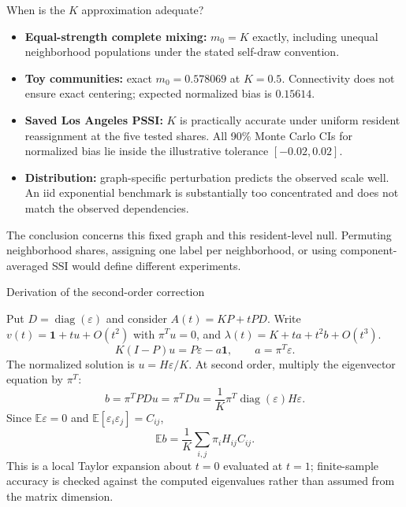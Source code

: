 \begin{frame}{When is the $K$ approximation adequate?}
\small

\begin{itemize}
\item \textbf{Equal-strength complete mixing:} $m_0=K$ exactly, including unequal neighborhood populations under the stated self-draw convention.
\item \textbf{Toy communities:} exact $m_0=0.578069$ at $K=0.5$. Connectivity does not ensure exact centering; expected normalized bias is $0.15614$.
\item \textbf{Saved Los Angeles PSSI:} $K$ is practically accurate under uniform resident reassignment at the five tested shares. All 90\% Monte Carlo CIs for normalized bias lie inside the illustrative tolerance $[-0.02,0.02]$.
\item \textbf{Distribution:} graph-specific perturbation predicts the observed scale well. An iid exponential benchmark is substantially too concentrated and does not match the observed dependencies.
\end{itemize}
\medskip
The conclusion concerns this fixed graph and this resident-level null. Permuting neighborhood shares, assigning one label per neighborhood, or using component-averaged SSI would define different experiments.

\end{frame}

\begin{frame}{Derivation of the second-order correction}
\small

Put $D=\operatorname{diag}(\varepsilon)$ and consider $A(t)=KP+tPD$.
Write $v(t)=\mathbf1+t u+O(t^2)$ with $\pi^Tu=0$, and
$\lambda(t)=K+t a+t^2 b+O(t^3)$.
\[
 K(I-P)u=P\varepsilon-a\mathbf1,\qquad a=\pi^T\varepsilon.
\]
The normalized solution is $u=H\varepsilon/K$. At second order, multiply the eigenvector equation by $\pi^T$:
\[
 b=\pi^TPD u=\pi^TDu
   =\frac1K\pi^T\operatorname{diag}(\varepsilon)H\varepsilon.
\]
Since $\mathbb E\varepsilon=0$ and $\mathbb E[\varepsilon_i\varepsilon_j]=C_{ij}$,
\[
 \mathbb E b=\frac1K\sum_{i,j}\pi_iH_{ij}C_{ij}.
\]
\footnotesize This is a local Taylor expansion about $t=0$ evaluated at $t=1$; finite-sample accuracy is checked against the computed eigenvalues rather than assumed from the matrix dimension.

\end{frame}

